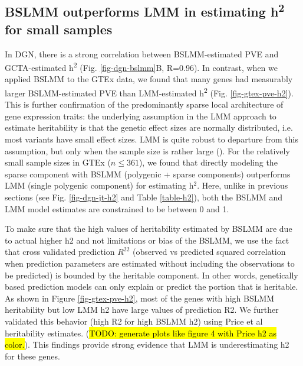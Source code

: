\documentclass[10pt,letterpaper]{article}
\begin{document}
\subsection*{BSLMM outperforms LMM in estimating h\textsuperscript{2}  for small samples}

In DGN, there is a strong correlation between BSLMM-estimated PVE and GCTA-estimated h\textsuperscript{2} (Fig. \ref{fig-dgn-bslmm}B, R=0.96). In contrast, when we applied BSLMM to the GTEx data, we found that many genes had measurably larger BSLMM-estimated PVE than LMM-estimated h\textsuperscript{2} (Fig. \ref{fig-gtex-pve-h2}). This is further confirmation of the predominantly sparse local architecture of gene expression traits: the underlying assumption in the LMM approach to estimate heritability is that the genetic effect sizes are normally distributed, i.e. most variants have small effect sizes. LMM is quite robust to departure from this assumption, but only when the sample size is rather large (). For the relatively small sample sizes in GTEx (\(n \leq 361\)), we found that directly modeling the sparse component with BSLMM (polygenic + sparse components) outperforms LMM (single polygenic component) for estimating h$^2$. Here, unlike in previous sections (see Fig. \ref{fig-dgn-jt-h2} and Table \ref{table-h2}), both the BSLMM and LMM model estimates are constrained to be between 0 and 1. 

To make sure that the high values of heritability estimated by BSLMM are due to actual higher h2 and not limitations or bias of the BSLMM, we use the fact that cross validated prediction $R^22$ (observed vs predicted squared correlation when prediction parameters are estimated without including the observations to be predicted) is bounded by the heritable component. In other words, genetically based prediction models can only explain or predict the portion that is heritable. As shown in Figure \ref{fig-gtex-pve-h2}, most of the genes with high BSLMM heritability but low LMM h2 have large values of prediction R2. 
We further validated this behavior (high R2 for high BSLMM h2) using Price et al heritability estimates. (\hl{TODO: generate plots like figure 4 with Price h2 as color.}). This findings provide strong evidence that LMM is underestimating h2 for these genes.

\end{document}
